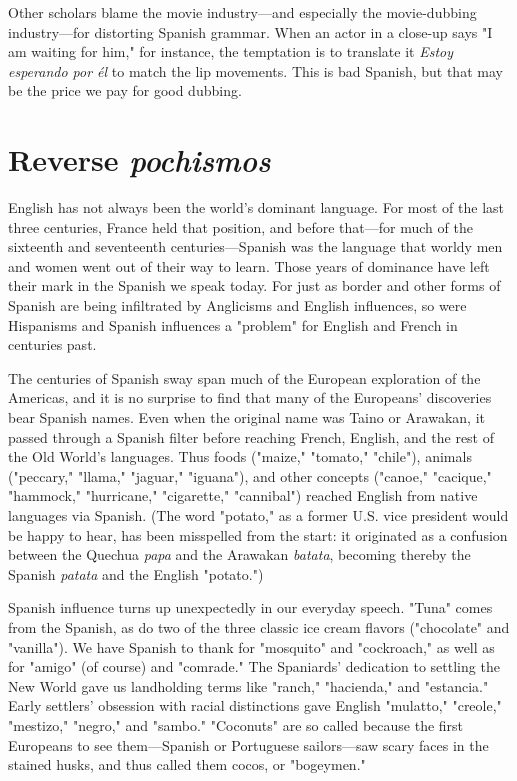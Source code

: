 Other scholars blame the movie industry---and especially the
movie-dubbing industry---for distorting Spanish grammar. When an
actor in a close-up says "I am waiting for him," for instance, the temptation is to translate it \emph{Estoy esperando por él} to match the lip movements. This is bad Spanish, but that may be the price we pay for good
dubbing.

\section{Reverse \emph{pochismos}}

English has not always been the world's dominant language.
For most of the last three centuries, France held that position, and before that---for much of the sixteenth and seventeenth centuries---Spanish was the language that worldy men and women went out of their
way to learn. Those years of dominance have left their mark in the
Spanish we speak today. For just as border and other forms of Spanish
are being infiltrated by Anglicisms and English influences, so were Hispanisms and Spanish influences a "problem" for English and French in
centuries past.

The centuries of Spanish sway span much of the European
exploration of the Americas, and it is no surprise to find that many of the
Europeans' discoveries bear Spanish names. Even when the original
name was Taino or Arawakan, it passed through a Spanish filter before
reaching French, English, and the rest of the Old World's languages.
Thus foods ("maize," "tomato," "chile"), animals ("peccary," "llama,"
"jaguar," "iguana"), and other concepts ("canoe," "cacique," "hammock," "hurricane," "cigarette," "cannibal") reached English from native languages via Spanish. (The word "potato," as a former U.S. vice
president would be happy to hear, has been misspelled from the start:
it originated as a confusion between the Quechua \emph{papa} and the Arawakan \emph{batata}, becoming thereby the Spanish \emph{patata} and the English
"potato.")

Spanish influence turns up unexpectedly in our everyday
speech. "Tuna" comes from the Spanish, as do two of the three classic
ice cream flavors ("chocolate" and "vanilla"). We have Spanish to
thank for "mosquito" and "cockroach," as well as for "amigo" (of
course) and "comrade." The Spaniards' dedication to settling the New
World gave us landholding terms like "ranch," "hacienda," and "estancia." Early settlers' obsession with racial distinctions gave English
"mulatto," "creole," "mestizo," "negro," and "sambo." "Coconuts" are
so called because the first Europeans to see them---Spanish or Portuguese sailors---saw scary faces in the stained husks, and thus called
them cocos, or "bogeymen."

